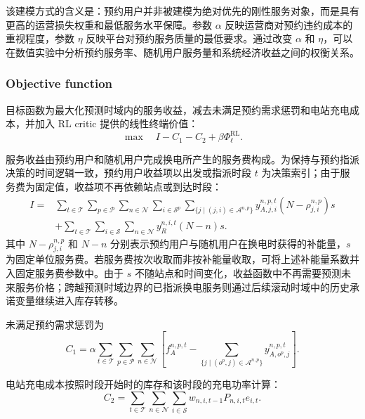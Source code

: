 \documentclass[12pt,hyperref,a4paper,UTF8]{ctexart}
\begin{document}
该建模方式的含义是：预约用户并非被建模为绝对优先的刚性服务对象，而是具有更高的运营损失权重和最低服务水平保障。参数 $\alpha$ 反映运营商对预约违约成本的重视程度，参数 $\eta$ 反映平台对预约服务质量的最低要求。通过改变 $\alpha$ 和 $\eta$，可以在数值实验中分析预约服务率、随机用户服务量和系统经济收益之间的权衡关系。

\subsubsection{Objective function}

目标函数为最大化预测时域内的服务收益，减去未满足预约需求惩罚和电站充电成本，并加入 RL critic 提供的线性终端价值：
\begin{equation}
\max \quad I-C_1-C_2+\beta\Phi^{\mathrm{RL}}_{\ell}.
\label{eq:objective}
\end{equation}

服务收益由预约用户和随机用户完成换电所产生的服务费构成。为保持与预约指派决策的时间逻辑一致，预约用户收益项以出发或指派时段 $t$ 为决策索引；由于服务费为固定值，收益项不再依赖站点或到达时段：
\begin{equation}
\begin{aligned}
I=&
\sum_{t\in\mathcal{T}}\sum_{p\in\mathcal{P}}\sum_{n\in\mathcal{N}}
\sum_{i\in\mathcal{S}^{p}}
\sum_{\{j\mid (j,i)\in\mathcal{A}^{n,p}\}}
 y_{A,j,i}^{n,p,t}
\left(N-\rho_{j,i}^{n,p}\right)s
\\
&+
\sum_{t\in\mathcal{T}}\sum_{i\in\mathcal{S}}\sum_{n\in\mathcal{N}}
y_R^{n,i,t}(N-n)s.
\end{aligned}
\label{eq:income}
\end{equation}
其中 $N-\rho_{j,i}^{n,p}$ 和 $N-n$ 分别表示预约用户与随机用户在换电时获得的补能量，$s$ 为固定单位服务费。若服务费按次收取而非按补能量收取，可将上述补能量系数并入固定服务费参数中。由于 $s$ 不随站点和时间变化，收益函数中不再需要预测未来服务价格；跨越预测时域边界的已指派换电服务则通过后续滚动时域中的历史承诺变量继续进入库存转移。

未满足预约需求惩罚为
\begin{equation}
C_1 = \alpha \sum_{t\in \mathcal{T}} \sum_{p\in \mathcal{P}}  \sum_{n\in \mathcal{N}} 
\left[
f_A^{n,p,t} - \sum_{\{j \mid (o^p,j) \in \mathcal{A}^{n,p}\}} y_{A,o^p,j}^{n,p,t} \right].
\label{eq:penaltycost}
\end{equation}

电站充电成本按照时段开始时的库存和该时段的充电功率计算：
\begin{equation}
C_2 = \sum_{t \in \mathcal{T}}  \sum_{n \in \mathcal{N}} \sum_{i \in \mathcal{S}}
 w_{n,i,t-1}P_{n,i,t}e_{i,t}.
\label{eq:chargingcost}
\end{equation}
\end{document}
